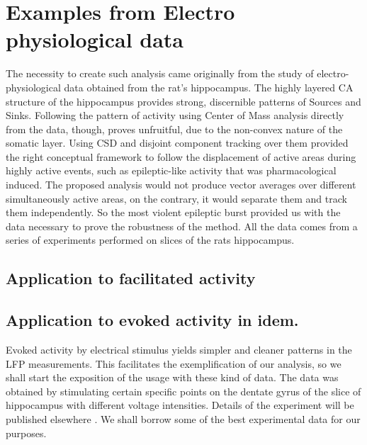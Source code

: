 \documentclass{article}
\begin{document}
 
\section{Examples from Electro physiological data}

The necessity to create such analysis came originally from the study of electro-physiological data obtained from the rat's hippocampus. The highly layered CA structure of the hippocampus provides strong, discernible patterns of Sources and Sinks. Following the pattern of activity using Center of Mass analysis directly from the data, though, proves unfruitful, due to the non-convex nature of the somatic layer. Using CSD and disjoint component tracking over them provided the right conceptual framework to follow the displacement of active areas during highly active events, such as epileptic-like activity that was pharmacological induced. The proposed analysis would not produce vector averages over different simultaneously active areas, on the contrary, it would separate them and track them independently. So the most violent epileptic burst provided us with the data necessary to prove the robustness of the method.
All the data comes from a series of experiments performed on slices of the rats hippocampus. 

\subsection{Application to facilitated activity}



\subsection{Application to evoked activity in idem.}\label{sec:evocada}

Evoked activity by electrical stimulus yields simpler and cleaner patterns in the LFP
measurements. This facilitates the exemplification of our analysis, so we shall
start the exposition of the usage with these kind of data.
The data was obtained by stimulating certain specific points on the dentate gyrus
of the slice of hippocampus with different voltage intensities. Details of the experiment
will be published elsewhere \cite{FrancoGut2017}. We shall borrow some of
the best experimental data for our purposes.
\end{document}
